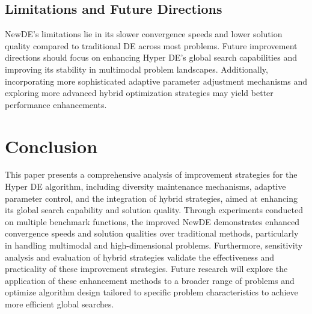 \documentclass[conference]{IEEEtran}
\begin{document}
\subsection{Limitations and Future Directions}

NewDE's limitations lie in its slower convergence speeds and lower solution quality compared to traditional DE across most problems. Future improvement directions should focus on enhancing Hyper DE's global search capabilities and improving its stability in multimodal problem landscapes. Additionally, incorporating more sophisticated adaptive parameter adjustment mechanisms and exploring more advanced hybrid optimization strategies may yield better performance enhancements.

\section{Conclusion}

This paper presents a comprehensive analysis of improvement strategies for the Hyper DE algorithm, including diversity maintenance mechanisms, adaptive parameter control, and the integration of hybrid strategies, aimed at enhancing its global search capability and solution quality. Through experiments conducted on multiple benchmark functions, the improved NewDE demonstrates enhanced convergence speeds and solution qualities over traditional methods, particularly in handling multimodal and high-dimensional problems. Furthermore, sensitivity analysis and evaluation of hybrid strategies validate the effectiveness and practicality of these improvement strategies. Future research will explore the application of these enhancement methods to a broader range of problems and optimize algorithm design tailored to specific problem characteristics to achieve more efficient global searches.
\end{document}
